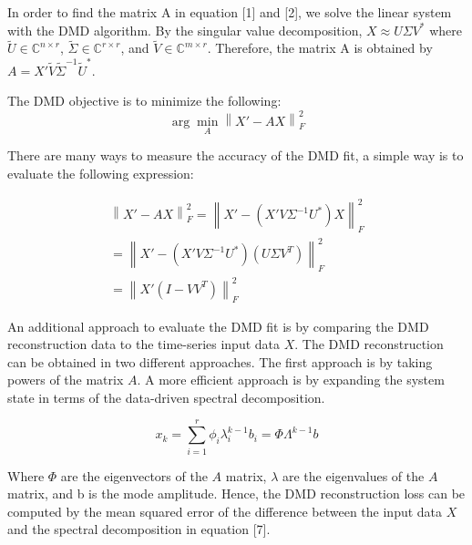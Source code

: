 \documentclass[twocolumn, letterpaper]{scrartcl}
\begin{document}
    In order to find the matrix A in equation [1] and [2], we solve the linear system with the DMD algorithm. By the singular value decomposition, $X \approx U \Sigma V^{*}$ where $\tilde{U} \in \mathbb{C}^{n \times r}$, $\tilde{\Sigma} \in \mathbb{C}^{r \times r}$, and $\tilde{V} \in \mathbb{C}^{m \times r}$. Therefore, the matrix A is obtained by $ A = X'\tilde{V}\tilde{\Sigma}^{-1}\tilde{U}^{*}$. 
    
    The DMD objective is to minimize the following:
    \begin{equation} \label{eq:5}
    \arg \min _{A}\left\| X' - A X \right\| _{F}^{2}
    \end{equation}
    
    There are many ways to measure the accuracy of the DMD fit, a simple way is to evaluate the following expression:
    
    \begin{equation} \label{eq:6}
        \begin{aligned}
        \left\| X'- AX \right\| _{F}^{2} = \left\| X'- (X' V  \Sigma^{-1} U^{*}) X \right\| _{F}^{2}\\
        = \left\| X'- (X'  V  \Sigma^{-1}  U^{*}) ( U \Sigma  V^{T}) \right\| _{F}^{2} \\  =\left\| X' ( I - V V^{T}) \right\| _{F}^{2}
        \end{aligned}
    \end{equation}
    
    An additional approach to evaluate the DMD fit is by comparing the DMD reconstruction data to the time-series input data $X$. The DMD reconstruction can be obtained in two different approaches. The first approach is by taking powers of the matrix $A$. A more efficient approach is by expanding the system state in terms of the data-driven spectral decomposition. 
    
    \begin{equation} \label{eq:7}
        x_{k} = \sum_{i=1}^{r} \phi_{i} \lambda_{i}^{k-1} b_{i} = \Phi \Lambda^{k-1} b
    \end{equation}
    
    Where $\Phi$ are the eigenvectors of the $A$ matrix, $\lambda$ are the eigenvalues of the $A$ matrix, and b is the mode amplitude. Hence, the DMD reconstruction loss can be computed by the mean squared error of the difference between the input data $X$ and the spectral decomposition in equation [7]. 
    
    
    
\end{document}
